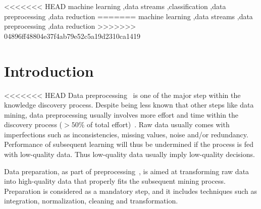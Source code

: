 \documentclass[preprint,12pt]{elsarticle}
\begin{document}
\begin{frontmatter}
\begin{abstract}
\end{abstract}

\begin{keyword}



<<<<<<< HEAD
machine learning \sep data streams \sep classification \sep data preprocessing \sep data reduction 
=======
machine learning \sep data streams \sep data preprocessing \sep data reduction 
>>>>>>> 04896ff48804e37f4ab79e52c5a19d2310ca1419

\end{keyword}

\end{frontmatter}


\section{Introduction}
\label{sec:intro}


<<<<<<< HEAD
Data preprocessing~\cite{garcia14, garcia16b} is one of the major step within the knowledge discovery process. Despite being less known that other steps like data mining, data preprocessing usually involves more effort and time within the discovery process ($> 50\%$ of total effort)~\cite{pyle99}. Raw data usually comes with imperfections such as inconsistencies, missing values, noise and/or redundancy. Performance of subsequent learning will thus be undermined if the process is fed with low-quality data. Thus low-quality data usually imply low-quality decisions.

Data preparation, as part of preprocessing~\cite{garcia14}, is aimed at transforming raw data into high-quality data that properly fits the subsequent mining process. Preparation is considered as a mandatory step, and it includes techniques such as integration, normalization, cleaning and transformation.
\end{document}
